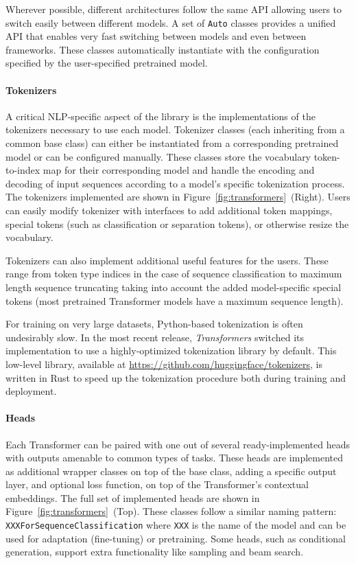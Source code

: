 Wherever possible, different architectures follow the same API allowing users to switch easily between different models. A set of \texttt{Auto} classes provides a unified API that enables very fast switching between models and even between frameworks. These classes automatically instantiate with the configuration specified by the user-specified pretrained model.

\paragraph{Tokenizers} A critical NLP-specific aspect of the library is the implementations of the tokenizers necessary to use each model. Tokenizer classes (each inheriting from a common base class) can either be instantiated from a corresponding pretrained model or can be configured manually. These classes store the vocabulary token-to-index map for their corresponding model and handle the encoding and decoding of input sequences according to a model's specific tokenization process. The tokenizers implemented are shown in Figure~\ref{fig:transformers}~(Right).  Users can easily modify tokenizer with interfaces to add additional token mappings, special tokens (such as classification or separation tokens), or otherwise resize the vocabulary.

Tokenizers can also implement additional useful features for the users. These range from token type indices in the case of sequence classification to maximum length sequence truncating taking into account the added model-specific special tokens (most pretrained Transformer models have a maximum sequence length).

For training on very large datasets, Python-based tokenization is often undesirably slow. In the most recent release, \textit{Transformers}  switched its implementation to use a highly-optimized tokenization library by default. This low-level library, available at \url{https://github.com/huggingface/tokenizers}, is written in Rust to speed up the tokenization procedure both during training and deployment.

\paragraph{Heads} Each Transformer can be paired with one out of several ready-implemented heads with outputs amenable to common types of tasks. These heads are implemented as additional wrapper classes on top of the base class, adding a specific output layer, and optional loss function, on top of the Transformer's contextual embeddings. The full set of implemented heads are shown in Figure~\ref{fig:transformers}~(Top). These classes follow a similar naming pattern: \texttt{XXXForSequenceClassification} where \texttt{XXX} is the name of the model and can be used for adaptation (fine-tuning) or pretraining. Some heads, such as conditional generation,  support extra functionality like sampling and beam search. 

